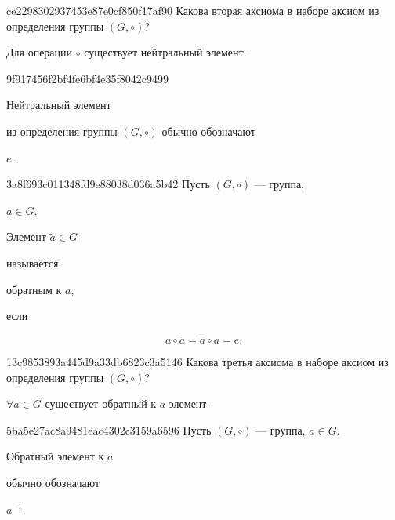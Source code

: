 \begin{note}{ce2298302937453e87e0cf850f17af90}
    Какова вторая аксиома в наборе аксиом из определения группы \({ (G, \circ) }\)?

    \begin{cloze}{1}
        Для операции \({ \circ }\) существует нейтральный элемент.
    \end{cloze}
\end{note}

\begin{note}{9f917456f2bf4fe6bf4e35f8042c9499}
    \begin{icloze}{2}Нейтральный элемент\end{icloze} из определения группы \({ (G, \circ) }\) обычно обозначают \begin{icloze}{1}\({ e }\).\end{icloze}
\end{note}

\begin{note}{3a8f693c011348fd9e88038d036a5b42}
    Пусть \({ (G, \circ) }\) --- группа,\: \begin{icloze}{4}\({ a \in G }\).\end{icloze} \begin{icloze}{2}Элемент \({ \tilde a \in G }\)\end{icloze} называется \begin{icloze}{3}обратным к \({ a }\),\end{icloze} если
    \begin{icloze}{1}
        \[
            a \circ \tilde a = \tilde a \circ a = e.
        \]
    \end{icloze}
\end{note}

\begin{note}{13c9853893a445d9a33db6823c3a5146}
    Какова третья аксиома в наборе аксиом из определения группы \({ (G, \circ) }\)?

    \begin{cloze}{1}
        \({ \forall a \in G }\) существует обратный к \({ a }\) элемент.
    \end{cloze}
\end{note}

\begin{note}{5ba5e27ac8a9481eac4302c3159a6596}
    Пусть \({ (G, \circ) }\) --- группа, \({ a \in G }\). \begin{icloze}{2}Обратный элемент к \({ a }\)\end{icloze} обычно обозначают \begin{icloze}{1}\({ a^{-1} }\).\end{icloze}
\end{note}

